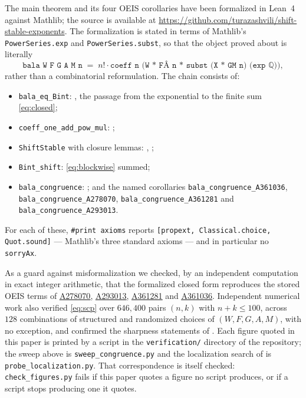 \documentclass[11pt,a4paper]{article}
\theoremstyle{plain}
\theoremstyle{definition}
\newcommand{\Q}{\mathbb{Q}}
\newcommand{\oeis}[1]{\href{https://oeis.org/#1}{\underline{#1}}}
\begin{document}
The main theorem and its four OEIS corollaries have been formalized in Lean~4 against
Mathlib; the source is available
at \url{https://github.com/turazashvili/shift-stable-exponents}. The formalization is stated in terms of Mathlib's
\texttt{PowerSeries.exp} and \texttt{PowerSeries.subst}, so that the object proved about
is literally
\[
  \texttt{bala W F G A M n} \;=\; n!\cdot\texttt{coeff n (W * F\^{}A n * subst (X * G\^{}M n) (exp }\Q\texttt{))},
\]
rather than a combinatorial reformulation. The chain consists of:
\begin{itemize}[nosep]
  \item \texttt{bala\_eq\_Bint}: , the passage from the exponential to
        the finite sum \eqref{eq:closed};
  \item \texttt{coeff\_one\_add\_pow\_mul}: ;
  \item \texttt{ShiftStable} with closure lemmas: , ;
  \item \texttt{Bint\_shift}: \eqref{eq:blockwise} summed;
  \item \texttt{bala\_congruence}: ; and the named corollaries\newline
        \texttt{bala\_congruence\_A361036},
        \texttt{bala\_congruence\_A278070},
        \texttt{bala\_congruence\_A361281} and
        \texttt{bala\_congruence\_A293013}.
\end{itemize}
For each of these, \texttt{\#print axioms} reports
\texttt{[propext, Classical.choice, Quot.sound]} --- Mathlib's three standard axioms ---
and in particular no \texttt{sorryAx}.

As a guard against misformalization we checked, by an independent computation in exact
integer arithmetic, that the formalized closed form reproduces the stored OEIS terms of
\oeis{A278070}, \oeis{A293013}, \oeis{A361281} and \oeis{A361036}. Independent numerical
work also verified \eqref{eq:scp} over $646{,}400$ pairs $(n,k)$ with $n+k\le100$, across
$128$ combinations of structured and randomized choices of $(W,F,G,A,M)$, with no
exception, and confirmed the sharpness statements of . Each figure quoted
in this paper is printed by a script in the \texttt{verification/} directory of the
repository; the sweep above is \texttt{sweep\_congruence.py} and the localization search of
 is \texttt{probe\_localization.py}. That correspondence is itself checked:
\texttt{check\_figures.py} fails if this paper quotes a figure no script produces, or if a
script stops producing one it quotes.
\end{document}
